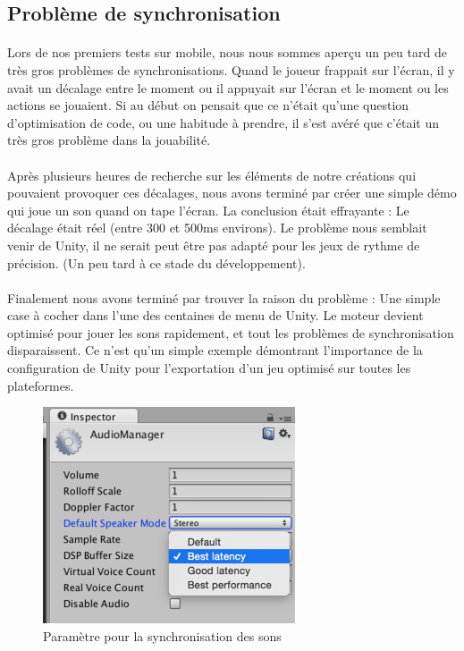 \subsection{Problème de synchronisation}

\paragraph{}
Lors de nos premiers tests sur mobile, nous nous sommes aperçu un peu tard de très gros problèmes de synchronisations.
Quand le joueur frappait sur l'écran, il y avait un décalage entre le moment ou il appuyait sur l'écran et le moment ou les actions se jouaient. Si au début on pensait que ce n'était qu'une question d'optimisation de code, ou une habitude à prendre, il s'est avéré que c'était un très gros problème dans la jouabilité.

\paragraph{}
Après plusieurs heures de recherche sur les éléments de notre créations qui pouvaient provoquer ces décalages, nous avons terminé par créer une simple démo qui joue un son quand on tape l'écran. La conclusion était effrayante : Le décalage était réel (entre 300 et 500ms environs). Le problème nous semblait venir de Unity, il ne serait peut être pas adapté pour les jeux de rythme de précision. (Un peu tard à ce stade du développement).

\paragraph{}
Finalement nous avons terminé par trouver la raison du problème : Une simple case à cocher dans l'une des centaines de menu de Unity. Le moteur devient optimisé pour jouer les sons rapidement, et tout les problèmes de synchronisation disparaissent. Ce n'est qu'un simple exemple démontrant l'importance de la configuration de Unity pour l'exportation d'un jeu optimisé sur toutes les plateformes.

\begin{figure}[H]\centering
  \includegraphics[scale=1]{./img/opti_sound.png}
  \caption{Paramètre pour la synchronisation des sons}
  \label{transitions_scenes}
\end{figure}



